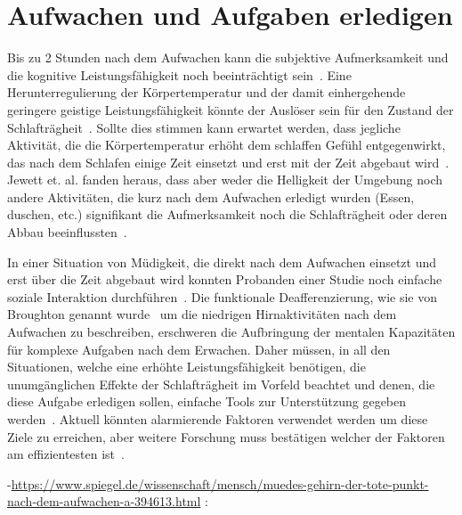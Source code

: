 \section{Aufwachen und Aufgaben erledigen}\label{sec:relatedWork.aufwachen}

Bis zu 2 Stunden nach dem Aufwachen kann die subjektive Aufmerksamkeit und die kognitive Leistungsfähigkeit noch beeinträchtigt sein~\cite{jewett1999time}. Eine Herunterregulierung der Körpertemperatur und der damit einhergehende geringere geistige Leistungsfähigkeit könnte der Auslöser sein für den Zustand der Schlafträgheit~\cite{dinges1990you}. Sollte dies stimmen kann erwartet werden, dass jegliche Aktivität, die die Körpertemperatur erhöht dem schlaffen Gefühl entgegenwirkt, das nach dem Schlafen einige Zeit einsetzt und erst mit der Zeit abgebaut wird~\cite{jewett1999time}. Jewett et. al. fanden heraus, dass aber weder die Helligkeit der Umgebung noch andere Aktivitäten, die kurz nach dem Aufwachen erledigt wurden (Essen, duschen, etc.) signifikant die Aufmerksamkeit noch die Schlafträgheit oder deren Abbau beeinflussten~\cite{jewett1999time}.

In einer Situation von Müdigkeit, die direkt nach dem Aufwachen einsetzt und erst über die Zeit abgebaut wird konnten Probanden einer Studie noch einfache soziale Interaktion durchführen~\cite{dinges1990you}. Die funktionale Deafferenzierung, wie sie von Broughton genannt wurde~\cite{broughton1968sleep} um die niedrigen Hirnaktivitäten nach dem Aufwachen zu beschreiben, erschweren die Aufbringung der mentalen Kapazitäten für komplexe Aufgaben nach dem Erwachen. Daher müssen, in all den Situationen, welche eine erhöhte Leistungsfähigkeit benötigen, die unumgänglichen Effekte der Schlafträgheit im Vorfeld beachtet und denen, die diese Aufgabe erledigen sollen, einfache Tools zur Unterstützung gegeben werden~\cite{ferrara2000sleep}. Aktuell könnten alarmierende Faktoren verwendet werden um diese Ziele zu erreichen, aber weitere Forschung muss bestätigen welcher der Faktoren am effizientesten ist~\cite{ferrara2000sleep}.


-\url{https://www.spiegel.de/wissenschaft/mensch/muedes-gehirn-der-tote-punkt-nach-dem-aufwachen-a-394613.html} :

